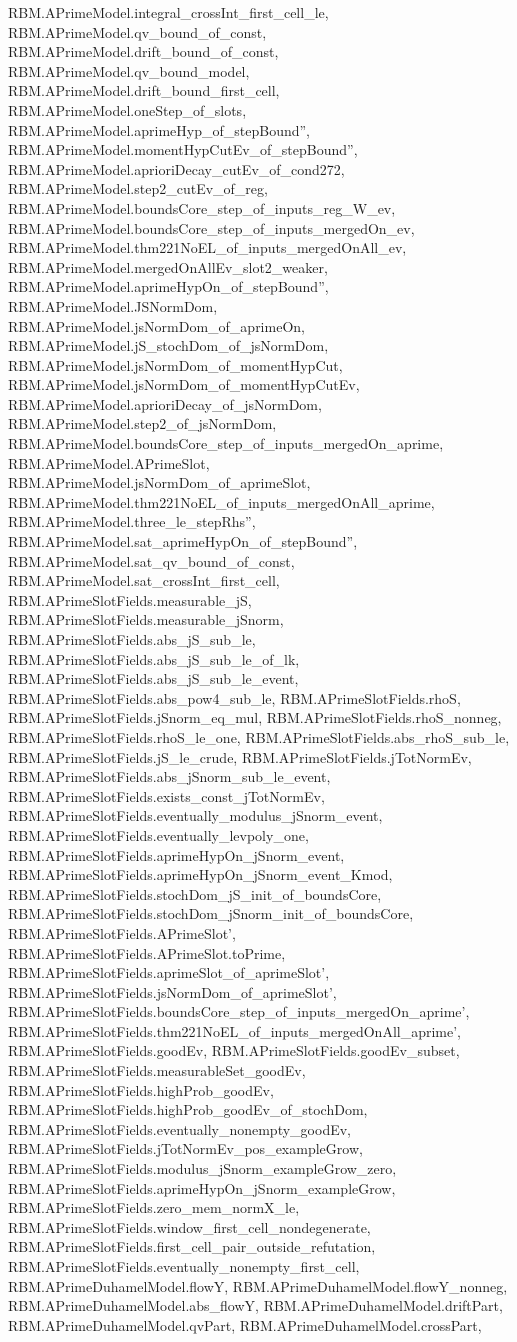\begin{theorem}
RBM.APrimeModel.integral_crossInt_first_cell_le, RBM.APrimeModel.qv_bound_of_const, RBM.APrimeModel.drift_bound_of_const, RBM.APrimeModel.qv_bound_model, RBM.APrimeModel.drift_bound_first_cell, RBM.APrimeModel.oneStep_of_slots, RBM.APrimeModel.aprimeHyp_of_stepBound'', RBM.APrimeModel.momentHypCutEv_of_stepBound'', RBM.APrimeModel.aprioriDecay_cutEv_of_cond272, RBM.APrimeModel.step2_cutEv_of_reg, RBM.APrimeModel.boundsCore_step_of_inputs_reg_W_ev, RBM.APrimeModel.boundsCore_step_of_inputs_mergedOn_ev, RBM.APrimeModel.thm221NoEL_of_inputs_mergedOnAll_ev, RBM.APrimeModel.mergedOnAllEv_slot2_weaker, RBM.APrimeModel.aprimeHypOn_of_stepBound'', RBM.APrimeModel.JSNormDom, RBM.APrimeModel.jsNormDom_of_aprimeOn, RBM.APrimeModel.jS_stochDom_of_jsNormDom, RBM.APrimeModel.jsNormDom_of_momentHypCut, RBM.APrimeModel.jsNormDom_of_momentHypCutEv, RBM.APrimeModel.aprioriDecay_of_jsNormDom, RBM.APrimeModel.step2_of_jsNormDom, RBM.APrimeModel.boundsCore_step_of_inputs_mergedOn_aprime, RBM.APrimeModel.APrimeSlot, RBM.APrimeModel.jsNormDom_of_aprimeSlot, RBM.APrimeModel.thm221NoEL_of_inputs_mergedOnAll_aprime, RBM.APrimeModel.three_le_stepRhs'', RBM.APrimeModel.sat_aprimeHypOn_of_stepBound'', RBM.APrimeModel.sat_qv_bound_of_const, RBM.APrimeModel.sat_crossInt_first_cell, RBM.APrimeSlotFields.measurable_jS, RBM.APrimeSlotFields.measurable_jSnorm, RBM.APrimeSlotFields.abs_jS_sub_le, RBM.APrimeSlotFields.abs_jS_sub_le_of_lk, RBM.APrimeSlotFields.abs_jS_sub_le_event, RBM.APrimeSlotFields.abs_pow4_sub_le, RBM.APrimeSlotFields.rhoS, RBM.APrimeSlotFields.jSnorm_eq_mul, RBM.APrimeSlotFields.rhoS_nonneg, RBM.APrimeSlotFields.rhoS_le_one, RBM.APrimeSlotFields.abs_rhoS_sub_le, RBM.APrimeSlotFields.jS_le_crude, RBM.APrimeSlotFields.jTotNormEv, RBM.APrimeSlotFields.abs_jSnorm_sub_le_event, RBM.APrimeSlotFields.exists_const_jTotNormEv, RBM.APrimeSlotFields.eventually_modulus_jSnorm_event, RBM.APrimeSlotFields.eventually_levpoly_one, RBM.APrimeSlotFields.aprimeHypOn_jSnorm_event, RBM.APrimeSlotFields.aprimeHypOn_jSnorm_event_Kmod, RBM.APrimeSlotFields.stochDom_jS_init_of_boundsCore, RBM.APrimeSlotFields.stochDom_jSnorm_init_of_boundsCore, RBM.APrimeSlotFields.APrimeSlot', RBM.APrimeSlotFields.APrimeSlot.toPrime, RBM.APrimeSlotFields.aprimeSlot_of_aprimeSlot', RBM.APrimeSlotFields.jsNormDom_of_aprimeSlot', RBM.APrimeSlotFields.boundsCore_step_of_inputs_mergedOn_aprime', RBM.APrimeSlotFields.thm221NoEL_of_inputs_mergedOnAll_aprime', RBM.APrimeSlotFields.goodEv, RBM.APrimeSlotFields.goodEv_subset, RBM.APrimeSlotFields.measurableSet_goodEv, RBM.APrimeSlotFields.highProb_goodEv, RBM.APrimeSlotFields.highProb_goodEv_of_stochDom, RBM.APrimeSlotFields.eventually_nonempty_goodEv, RBM.APrimeSlotFields.jTotNormEv_pos_exampleGrow, RBM.APrimeSlotFields.modulus_jSnorm_exampleGrow_zero, RBM.APrimeSlotFields.aprimeHypOn_jSnorm_exampleGrow, RBM.APrimeSlotFields.zero_mem_normX_le, RBM.APrimeSlotFields.window_first_cell_nondegenerate, RBM.APrimeSlotFields.first_cell_pair_outside_refutation, RBM.APrimeSlotFields.eventually_nonempty_first_cell, RBM.APrimeDuhamelModel.flowY, RBM.APrimeDuhamelModel.flowY_nonneg, RBM.APrimeDuhamelModel.abs_flowY, RBM.APrimeDuhamelModel.driftPart, RBM.APrimeDuhamelModel.qvPart, RBM.APrimeDuhamelModel.crossPart, 
\end{theorem}
